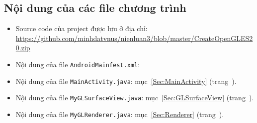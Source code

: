 \documentclass[13pt,a4paper]{extreport}
\begin{document}
\newpage
\subsection{Nội dung của các file chương trình}
	\begin{itemize}
		\item Source code của project được lưu ở địa chỉ: \url{https://github.com/minhdatvnus/nienluan3/blob/master/CreateOpenGLES20.zip}
		
		\item Nội dung của file \verb|AndroidMainfest.xml|:
			
		
		\item Nội dung của file \verb|MainActivity.java|: mục~\ref{Sec:MainActivity} (trang~\pageref{Sec:MainActivity}).
		
		\item Nội dung của file \verb|MyGLSurfaceView.java|: mục~\ref{Sec:GLSurfaceView} (trang~\pageref{Sec:GLSurfaceView}).
		
		\item Nội dung của file \verb|MyGLRenderer.java|: mục~\ref{Sec:Renderer} (trang~\pageref{Sec:Renderer}).


\end{itemize}
\end{document}

